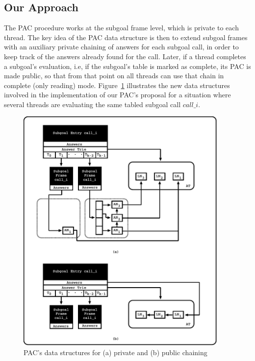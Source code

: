 \documentclass{llncs}
\begin{document}



\subsection{Our Approach}

The PAC procedure works at the subgoal frame level, which is private
to each thread. The key idea of the PAC data structure is then to
extend subgoal frames with an auxiliary private chaining of answers
for each subgoal call, in order to keep track of the answers already
found for the call. Later, if a thread completes a subgoal's
evaluation, i.e, if the subgoal's table is marked as complete, its PAC
is made public, so that from that point on all threads can use that
chain in complete (only reading) mode. Figure~\ref{fig_tabtries_pcc}
illustrates the new data structures involved in the implementation of
our PAC's proposal for a situation where several threads are
evaluating the same tabled subgoal call $call\_i$.

\begin{figure}[!ht]
\centering
\includegraphics[width=10.5cm]{figures/pcc.pdf}
\caption{PAC's data structures for (a) private and (b) public
  chaining}
\label{fig_tabtries_pcc}
\end{figure}
\end{document}
